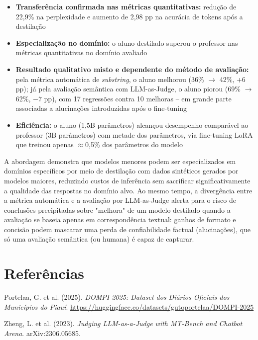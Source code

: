 \documentclass[12pt, a4paper]{article}
\begin{document}
\begin{itemize}
  \item \textbf{Transferência confirmada nas métricas quantitativas:} redução de
        22,9\% na perplexidade e aumento de 2,98 pp na acurácia de tokens após a
        destilação
  \item \textbf{Especialização no domínio:} o aluno destilado superou o professor
        nas métricas quantitativas no domínio avaliado
  \item \textbf{Resultado qualitativo misto e dependente do método de avaliação:}
        pela métrica automática de \textit{substring}, o aluno melhorou (36\%
        $\rightarrow$ 42\%, +6 pp); já pela avaliação semântica com LLM-as-Judge, o
        aluno piorou (69\% $\rightarrow$ 62\%, $-7$ pp), com 17 regressões contra
        10 melhoras -- em grande parte associadas a alucinações introduzidas após
        o fine-tuning
  \item \textbf{Eficiência:} o aluno (1,5B parâmetros) alcançou desempenho comparável
        ao professor (3B parâmetros) com metade dos parâmetros, via fine-tuning LoRA
        que treinou apenas $\approx$0,5\% dos parâmetros do modelo

\end{itemize}

A abordagem demonstra que modelos menores podem ser especializados em domínios
específicos por meio de destilação com dados sintéticos gerados por modelos maiores,
reduzindo custos de inferência sem sacrificar significativamente a qualidade das
respostas no domínio alvo. Ao mesmo tempo, a divergência entre a métrica automática
e a avaliação por LLM-as-Judge alerta para o risco de conclusões precipitadas sobre
"melhora" de um modelo destilado quando a avaliação se baseia apenas em correspondência
textual: ganhos de formato e concisão podem mascarar uma perda de confiabilidade
factual (alucinações), que só uma avaliação semântica (ou humana) é capaz de capturar.

\section*{Referências}

\begin{enumerate}[label={[\arabic*]}]
  \item \label{dompi2025} Portelaa, G. et al. (2025). \textit{DOMPI-2025: Dataset dos
        Diários Oficiais dos Municípios do Piauí}.
        \url{https://huggingface.co/datasets/gutoportelaa/DOMPI-2025}
  \item \label{llmjudge} Zheng, L. et al. (2023). \textit{Judging LLM-as-a-Judge with
        MT-Bench and Chatbot Arena}. arXiv:2306.05685.
\end{enumerate}
\end{document}
